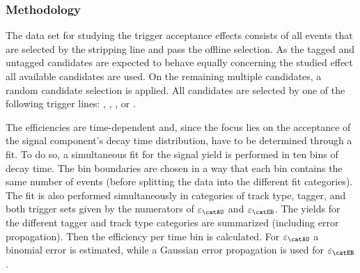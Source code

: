 \subsubsection{Methodology}
\label{sec:measurement_of_sin2beta:resolution_and_acceptance:acceptance:lower:methodology}

The data set for studying the trigger acceptance effects consists of all events
that are selected by the \StrippingDetached stripping line and pass the
offline selection. As the tagged and untagged candidates are expected to behave
equally concerning the studied effect all available candidates are used.
On the remaining multiple candidates, a random candidate selection is applied.
All candidates are selected by one of the following trigger lines:
\HLTOneDiMuonHighMass, \HLTOneTrackMuon, \HLTTwoDiMuonJpsi, or
\HLTTwoDiMuonDetachedJpsi.

The efficiencies are time-dependent and, since the focus lies on the acceptance
of the signal component's decay time distribution, have to be determined through
a fit. To do so, a simultaneous fit for the signal yield is performed in ten
bins of decay time. The bin boundaries are chosen in a way that each bin
contains the same number of events (before splitting the data into the different
fit categories). The fit is also performed simultaneously in categories of track
type, tagger, and both trigger sets given by the numerators of
$\varepsilon_\text{\catAU}$ and $\varepsilon_\text{\catEB}$. The yields for the
different tagger and track type categories are summarized (including error
propagation). Then the efficiency per time bin is calculated. For
$\varepsilon_{\catAU}$ a binomial error is estimated, while a Gaussian error
propagation is used for $\varepsilon_{\catEB}$.

